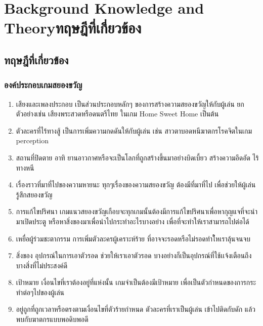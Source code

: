 \chapter{\ifenglish Background Knowledge and Theory\else ทฤษฎีที่เกี่ยวข้อง\fi}


\section{ทฤษฎีที่เกี่ยวข้อง}
\subsection{องค์ประกอบเกมสยองขวัญ} \cite{component-horror:theory}
\begin{enumerate}
  \item เสียงและเพลงประกอบ เป็นส่วนประกอบหลักๆ ของการสร้างความสยองขวัญให้กับผู้เล่น ยกตัวอย่างเช่น เสียงพระสวดหรือดนตรีไทย ในเกม Home Sweet Home เป็นต้น
  \item ตัวละครที่ไร้ทางสู้ เป็นการเพิ่มความกดดันให้กับผู้เล่น เช่น สาวตาบอดหนีฆาตกรโรคจิตในเกม perception
  \item สถานที่ปิดตาย อาทิ ยานอาวกาศหรือจะเป็นโลกที่ถูกสร้างขึ้นมาอย่างบิดเบี้ยว สร้างความอึดอัด ไร้ทางหนี
  \item เรื่องราวที่มาที่ไปของความหายนะ ทุกๆเรื่องของความสยองขวัญ ต้องมีที่มาที่ไป เพื่อช่วยให้ผู้เล่นรู้สึกสยองขวัญ
  \item การแก้ไขปริศนา เกมแนวสยองขวัญเกือบจะทุกเกมนั้นต้องมีการแก้ไขปริศนาเพื่อหากุญแจที่จะนำมาเปิดประตู หรือหาสิ่งของมาเพื่อนำไปกระทำอะไรบางอย่าง เพื่อที่จะทำให้เราสามารถไปต่อได้
  \item เหยื่อผู้ร่วมชะตากรรม การเพิ่มตัวละครผู้เคราะห์ร้าย ที่อาจจะรอดหรือไม่รอดทำใ้หเราลุ้นจนจบ
  \item สิ่งของ อุปกรณ์ในการเอาตัวรอด ช่วยให้เราเอาตัวรอด บางอย่างก็เป็นอุปกรณ์ที่ใช้เเจ้งเตือนถึงบางสิ่งที่ไม่ประสงค์ดี
  \item เป้าหมาย เงื่อนไขที่เราต้องอยู่ที่แห่งนั้น เกมจำเป็นต้องมีเป้าหมาย เพื่อเป็นตัวกำหนดของการกระทำต่อๆไปของผู้เล่น
  \item อยู่ถูกที่ถูกเวลาหรือตรงตามเงื่อนไขที่ตัวร้ายกำหนด ตัวละครที่เราเป็นผู้เล่น เข้าไปติดกับดัก แล้วพบกับฆาตกรแบบพอดิบพอดี
\end{enumerate}

